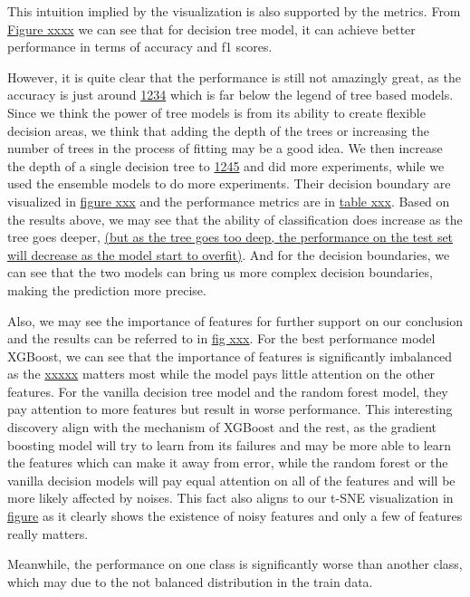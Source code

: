 \documentclass{article}
\begin{document}
This intuition implied by the visualization is also supported by the metrics. From \underline{Figure xxxx} we can see that for decision tree model, it can achieve better performance in terms of accuracy and f1 scores. 

However, it is quite clear that the performance is still not amazingly great, as the accuracy is just around \underline{1234} which is far below the legend of tree based models. Since we think the power of tree models is from its ability to create flexible decision areas, we think that adding the depth of the trees or increasing the number of trees in the process of fitting may be a good idea. We then increase the depth of a single decision tree to \underline{1245} and did more experiments,
while we used the ensemble models to do more experiments. Their decision boundary are visualized in \underline{figure xxx} and the performance metrics are in \underline{table xxx}. Based on the results above, we may see that the ability of classification does increase as the tree goes deeper, 
\underline{(but as the tree goes too deep, the performance on the test set will decrease as the model start to overfit)}. 
And for the decision boundaries, we can see that the two models can bring us more complex decision boundaries, making the prediction more precise. 



Also, we may see the importance of features for further support on our conclusion and the results can be referred to in \underline{fig xxx}. For the best performance model XGBoost, we can see that the importance of features is significantly imbalanced as the \underline{xxxxx} matters most while the model pays little attention on the other features. For the vanilla decision tree model and the random forest model, they pay attention to more features but result in worse performance. This
interesting discovery align with the mechanism of XGBoost and the rest, as the gradient boosting model will try to learn from its failures and may be more able to learn the features which can make it away from error, while the random forest or the vanilla decision models will pay equal attention on all of the features and will be more likely affected by noises. This fact also aligns to our t-SNE visualization in \underline{figure} as it clearly shows the existence of noisy features and
only a few of features really matters.

Meanwhile, the performance on one class is significantly worse than another class, which may due to the not balanced distribution in the train data.
\end{document}
